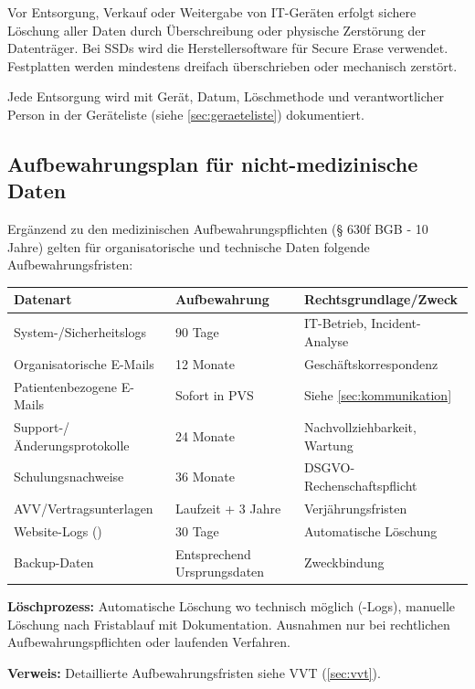 Vor Entsorgung, Verkauf oder Weitergabe von IT-Geräten erfolgt sichere Löschung aller
Daten durch Überschreibung oder physische Zerstörung der Datenträger. Bei SSDs wird die
Herstellersoftware für Secure Erase verwendet. Festplatten werden mindestens dreifach
überschrieben oder mechanisch zerstört.

\Dokumentation Jede Entsorgung wird mit Gerät, Datum, Löschmethode und
verantwortlicher Person in der Geräteliste (siehe \cref{sec:geraeteliste})
dokumentiert.

\subsection{Aufbewahrungsplan für nicht-medizinische Daten}
\label{sec:aufbewahrungsplan}

Ergänzend zu den medizinischen Aufbewahrungspflichten (§ 630f BGB - 10 Jahre)
gelten für organisatorische und technische Daten folgende Aufbewahrungsfristen:

\begin{center}
\begin{tabular}{p{5cm}p{2.5cm}p{6cm}}
\toprule
\textbf{Datenart} & \textbf{Aufbewahrung} & \textbf{Rechtsgrundlage/Zweck} \\
\midrule
System-/Sicherheitslogs & 90 Tage & IT-Betrieb, Incident-Analyse \\
Organisatorische E-Mails & 12 Monate & Geschäftskorrespondenz \\
Patientenbezogene E-Mails & Sofort in PVS & Siehe \cref{sec:kommunikation} \\
Support-/Änderungsprotokolle & 24 Monate & Nachvollziehbarkeit, Wartung \\
Schulungsnachweise & 36 Monate & DSGVO-Rechenschaftspflicht \\
AVV/Vertragsunterlagen & Laufzeit + 3 Jahre & Verjährungsfristen \\
Website-Logs (\HostingAnbieter{}) & 30 Tage & Automatische Löschung \\
Backup-Daten & Entsprechend Ursprungsdaten & Zweckbindung \\
\bottomrule
\end{tabular}
\end{center}

\textbf{Löschprozess:} Automatische Löschung wo technisch möglich (\HostingAnbieter{}-Logs),
manuelle Löschung nach Fristablauf mit Dokumentation. Ausnahmen nur bei
rechtlichen Aufbewahrungspflichten oder laufenden Verfahren.

\textbf{Verweis:} Detaillierte Aufbewahrungsfristen siehe VVT (\cref{sec:vvt}).

